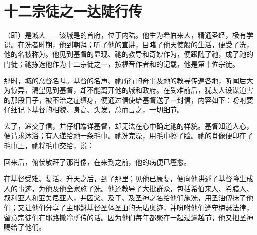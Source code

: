 
\chapter{十二宗徒之一达陡行传}


（即）是城人——该城是的首府，位于内陆。他生为希伯来人，精通圣经，极有学识。在洗者时期，他到朝拜；听了他的宣讲，目睹了他天使般的生活，便受了洗，他的名被称为。他见到基督的显现、祂的教导和奇妙作为，便跟随了祂，成了祂的门徒；祂拣选他作为十二宗徒之一，按福音作者和的记载，他是第十位宗徒。\par

那时，城的总督名叫。基督的名声、祂所行的奇事及祂的教导传遍各地，听闻后大为惊异，渴望见到基督，却不能离开他的城和政府。在受难前后，犹太人设谋迫害的那段日子，被不治之症缠身，便通过信使给基督送了一封信，内容如下：吩咐要仔细记下基督的相貌、身高、头发，总而言之，一切细节。\par

去了，递交了信，并仔细端详基督，却无法在心中确定祂的样貌。基督知道人心，便请求沐浴；有人递给祂一条毛巾。祂洗完澡，用毛巾擦了脸。祂的肖像便印在了毛巾上，祂将毛巾交给，说：\par

回来后，俯伏敬拜了那肖像，在来到之前，他的病便已痊愈。\par

在基督受难、复活、升天之后，到了那里；见他已康复，便向他讲述了基督降生成人的事迹，为他及他全家施了洗。他还教导了大批群众，包括希伯来人、希腊人、叙利亚人和亚美尼亚人，并因父、及子、及圣神之名给他们施洗，用圣油傅抹了他们；又让他们分享了主耶稣基督圣体圣血的无玷奥迹，并吩咐他们遵守梅瑟法律，留意宗徒们在耶路撒冷所传的话。因为他们每年都聚在一起过逾越节，他又把圣神赐给了他们。\par


